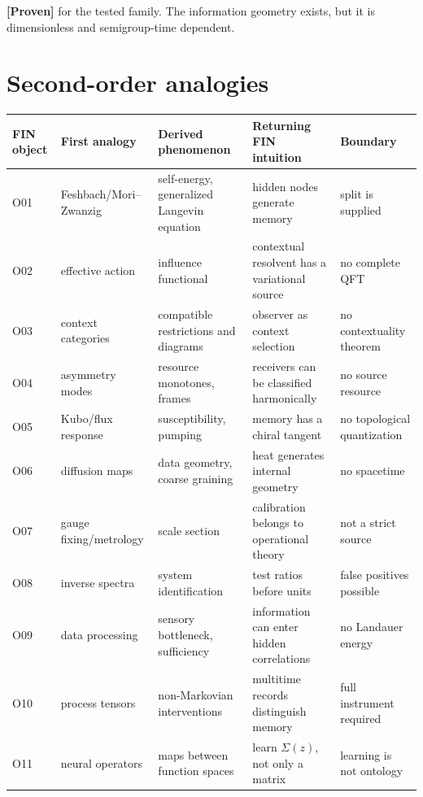 \documentclass[11pt,a4paper,openany]{report}
\newcommand{\statusProven}{\textcolor{fingreen}{[Proven]}}
\begin{document}
\textbf{\statusProven{}} for the tested family. The information geometry exists, but it is dimensionless and semigroup-time dependent.

\chapter{Second-order analogies}

\begin{center}
\begingroup\fontsize{7}{8.4}\selectfont
\setlength{\tabcolsep}{2.5pt}
\renewcommand{\arraystretch}{1.16}
\begin{longtable}{@{}p{}p{}p{}p{}p{}@{}}
\toprule
\textbf{FIN object} & \textbf{First analogy} & \textbf{Derived phenomenon} & \textbf{Returning FIN intuition} & \textbf{Boundary} \\
\midrule
\endhead
O01 & Feshbach/\allowbreak{}Mori--Zwanzig & self-energy, generalized Langevin equation & hidden nodes generate memory & split is supplied \\
O02 & effective action & influence functional & contextual resolvent has a variational source & no complete QFT \\
O03 & context categories & compatible restrictions and diagrams & observer as context selection & no contextuality theorem \\
O04 & asymmetry modes & resource monotones, frames & receivers can be classified harmonically & no source resource \\
O05 & Kubo/\allowbreak{}flux response & susceptibility, pumping & memory has a chiral tangent & no topological quantization \\
O06 & diffusion maps & data geometry, coarse graining & heat generates internal geometry & no spacetime \\
O07 & gauge fixing/\allowbreak{}metrology & scale section & calibration belongs to operational theory & not a strict source \\
O08 & inverse spectra & system identification & test ratios before units & false positives possible \\
O09 & data processing & sensory bottleneck, sufficiency & information can enter hidden correlations & no Landauer energy \\
O10 & process tensors & non-Markovian interventions & multitime records distinguish memory & full instrument required \\
O11 & neural operators & maps between function spaces & learn \(\Sigma(z)\), not only a matrix & learning is not ontology \\

\end{longtable}
\end{center}
\end{document}

